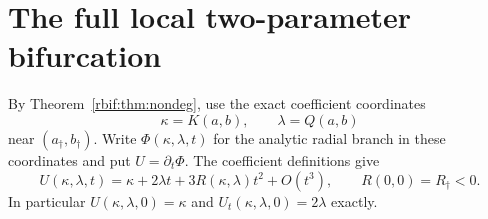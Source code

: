 \documentclass[11pt,a4paper]{article}
\theoremstyle{definition}\newtheorem{definition}[theorem]{Definition}
\theoremstyle{remark}\newtheorem{remark}[theorem]{Remark}
\newcommand{\rbpa}{a_\dagger}
\newcommand{\rbpb}{b_\dagger}
\newcommand{\rbrr}{R_\dagger}
\numberwithin{equation}{section}
\begin{document}
\section{The full local two-parameter bifurcation}
\label{rbif:sec:bifurcation}
By Theorem~\ref{rbif:thm:nondeg}, use the exact coefficient coordinates
\begin{equation}
 \kappa=K(a,b),\qquad \lambda=Q(a,b)
 \label{rbif:eq:coords}
\end{equation}
near $(\rbpa,\rbpb)$. Write $\Phi(\kappa,\lambda,t)$ for the analytic
radial branch in these coordinates and put $U=\partial_t\Phi$.
The coefficient definitions give
\begin{equation}
 U(\kappa,\lambda,t)=\kappa+2\lambda t
        +3R(\kappa,\lambda)t^2+O(t^3),\qquad
 R(0,0)=\rbrr<0.
 \label{rbif:eq:U}
\end{equation}
In particular $U(\kappa,\lambda,0)=\kappa$ and
$U_t(\kappa,\lambda,0)=2\lambda$ exactly.
\end{document}
